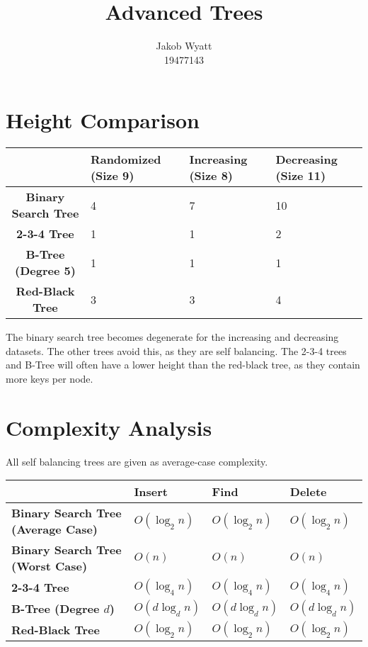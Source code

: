 \documentclass{article}
\title{Advanced Trees}
\author{Jakob Wyatt\\19477143}
\begin{document}
\maketitle
\section{Height Comparison}

\begin{table}[H]
\centering
\begin{tabularx}{\linewidth}{| c | X | X | X |}
\hline
 & \textbf{Randomized (Size 9)} & \textbf{Increasing (Size 8)} & \textbf{Decreasing (Size 11)} \\
\hline
\textbf{Binary Search Tree} & 4 & 7 & 10 \\
\hline
\textbf{2-3-4 Tree} & 1 & 1 & 2 \\
\hline
\textbf{B-Tree (Degree 5)}  & 1 & 1 & 1 \\
\hline
\textbf{Red-Black Tree} & 3 & 3 & 4 \\
\hline
\end{tabularx}
\end{table}

The binary search tree becomes degenerate for the increasing and decreasing datasets.
The other trees avoid this, as they are self balancing. The 2-3-4 trees and B-Tree
will often have a lower height than the red-black tree, as they contain more keys per node.

\section{Complexity Analysis}

All self balancing trees are given as average-case complexity.

\begin{table}[H]
\centering
\begin{tabularx}{\linewidth}{| X | X | X | X |}
\hline
 & \textbf{Insert} & \textbf{Find} & \textbf{Delete} \\
\hline
\textbf{Binary Search Tree (Average Case)} & $O\left(\log_2n\right)$ & $O\left(\log_2n\right)$ & $O\left(\log_2n\right)$ \\
\hline
\textbf{Binary Search Tree (Worst Case)} & $O\left(n\right)$ & $O\left(n\right)$ & $O\left(n\right)$ \\
\hline
\textbf{2-3-4 Tree} & $O\left(\log_4n\right)$ & $O\left(\log_4n\right)$ & $O\left(\log_4n\right)$ \\
\hline
\textbf{B-Tree (Degree $d$)}  & $O\left(d\log_dn\right)$ & $O\left(d\log_dn\right)$ & $O\left(d\log_dn\right)$ \\
\hline
\textbf{Red-Black Tree} & $O\left(\log_2n\right)$ & $O\left(\log_2n\right)$ & $O\left(\log_2n\right)$ \\
\hline
\end{tabularx}
\end{table}
\end{document}
